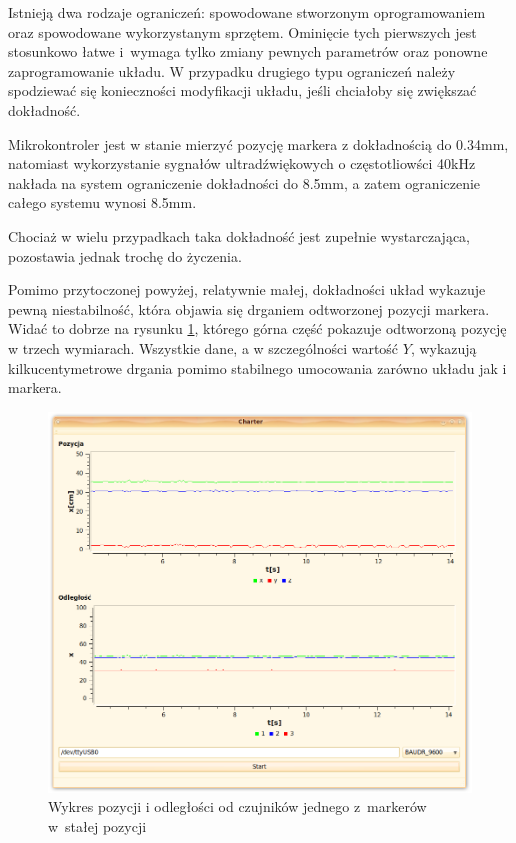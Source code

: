 Istnieją dwa rodzaje ograniczeń: spowodowane stworzonym oprogramowaniem oraz spowodowane wykorzystanym sprzętem. Ominięcie tych pierwszych jest stosunkowo łatwe i~wymaga tylko zmiany pewnych parametrów oraz ponowne zaprogramowanie układu. W przypadku drugiego typu ograniczeń należy spodziewać się konieczności modyfikacji układu, jeśli chciałoby się zwiększać dokładność.

Mikrokontroler jest w stanie mierzyć pozycję markera z dokładnością do 0.34mm, natomiast wykorzystanie sygnałów ultradźwiękowych o częstotliowści 40kHz nakłada na system ograniczenie dokładności do 8.5mm, a zatem ograniczenie całego systemu wynosi 8.5mm.

Chociaż w wielu przypadkach taka dokładność jest zupełnie wystarczająca, pozostawia jednak trochę do życzenia.

Pomimo przytoczonej powyżej, relatywnie małej, dokładności układ wykazuje pewną niestabilność, która objawia się drganiem odtworzonej pozycji markera. Widać to dobrze na rysunku \ref{fig:charter_shaky}, którego górna część pokazuje odtworzoną pozycję w trzech wymiarach. Wszystkie dane, a w szczególności wartość $Y$, wykazują kilkucentymetrowe drgania pomimo stabilnego umocowania zarówno układu jak i markera.

\begin{figure}
 \includegraphics[width=\textwidth]{gfx/charter_shaky.png}
 \caption[Wykres pozycji i odległości jednego z markerów]{Wykres pozycji i odległości od czujników jednego z~markerów w~stałej pozycji}
 \label{fig:charter_shaky}
\end{figure}
